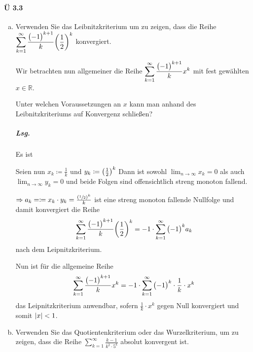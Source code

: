 \documentclass{scrreprt}
\begin{document}
\paragraph{Ü 3.3}
\begin{enumerate}[(a)]
\item Verwenden Sie das Leibnitzkriterium um zu zeigen, dass die Reihe
  $\displaystyle \sum_{k = 1}^{\infty} \frac{\qty\big(-1)^{k + 1}}{k} \qty(\frac{1}{2})^k$
  konvergiert.

  Wir betrachten nun allgemeiner die Reihe
  $\displaystyle \sum_{k = 1}^{\infty} \frac{\qty\big(-1)^{k + 1}}{k} x^k$ mit
  fest gewählten $x \in \mathbb{R}$.

  Unter welchen Voraussetzungen an $x$ kann man anhand des Leibnitzkriteriums
  auf Konvergenz schließen?

  \subparagraph{Lsg.} Es ist
  Seien nun $x_k \coloneqq \frac{1}{k}$ und $y_k \coloneqq \qty(\frac{1}{2})^k$
  Dann ist sowohl $\displaystyle \lim_{n \to \infty} x_k = 0$ als auch
  $\displaystyle \lim_{n \to \infty} y_k = 0$ und beide Folgen sind
  offensichtlich streng monoton fallend.

  $\Rightarrow a_k = \coloneqq x_k \cdot y_k = \frac{\qty(\sfrac{1}{2})^k}{k}$
  ist eine streng monoton fallende Nullfolge und damit konvergiert die Reihe
  \[
    \sum_{k = 1}^{\infty} \frac{\qty\big(-1)^{k + 1}}{k} \qty(\frac{1}{2})^k
    = -1 \cdot \sum_{k = 1}^{\infty} \qty\big(-1)^k a_k
  \]
  nach dem Leipnitzkriterium.

  Nun ist für die allgemeine Reihe
  \[
    \sum_{k = 1}^{\infty} \frac{\qty\big(-1)^{k + 1}}{k} x^k
    = -1 \cdot \sum_{k = 1}^{\infty} \qty\big(-1)^k \cdot \frac{1}{k} \cdot x^k
  \]
  das Leipnitzkriterium anwendbar, sofern $\frac{1}{k} \cdot x^k$ gegen Null
  konvergiert und somit $\abs{x} < 1$.

\newpage
\item Verwenden Sie das Quotientenkriterium oder das Wurzelkriterium, um zu
  zeigen, dass die Reihe
  $\displaystyle \sum_{k = 1}^{\infty} \frac{k - 1}{k^2 \cdot 5^k}$ absolut
  konvergent ist.


\end{enumerate}
\end{document}
